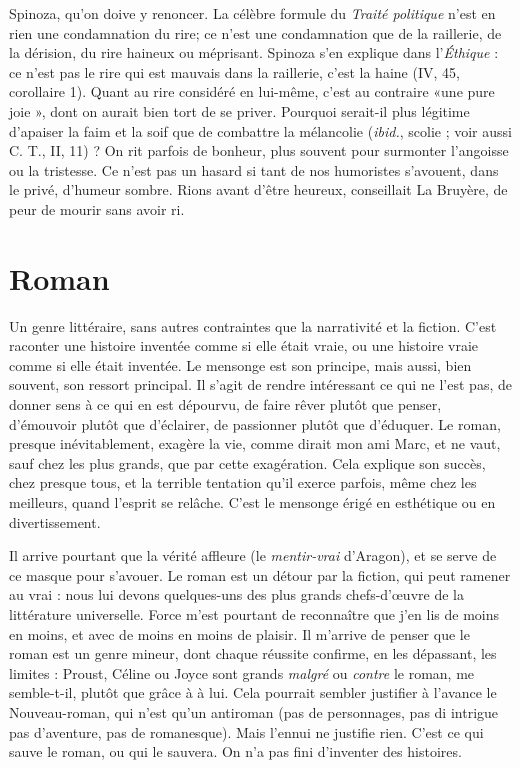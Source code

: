 Spinoza, qu'on doive y renoncer. La célèbre formule du {\it Traité politique} n’est
en rien une condamnation du rire; ce n’est une condamnation que de la
raillerie, de la dérision, du rire haineux ou méprisant. Spinoza s’en explique
dans l’{\it Éthique} : ce n’est pas le rire qui est mauvais dans la raillerie, c’est la haine
(IV, 45, corollaire 1). Quant au rire considéré en lui-même, c’est au contraire
«une pure joie », dont on aurait bien tort de se priver. Pourquoi serait-il plus
légitime d’apaiser la faim et la soif que de combattre la mélancolie ({\it ibid.},
scolie ; voir aussi C. T., II, 11) ? On rit parfois de bonheur, plus souvent pour
surmonter l'angoisse ou la tristesse. Ce n’est pas un hasard si tant de nos humoristes
s’avouent, dans le privé, d'humeur sombre. Rions avant d’être heureux,
conseillait La Bruyère, de peur de mourir sans avoir ri.

\section{Roman}
Un genre littéraire, sans autres contraintes que la narrativité et la
fiction. C’est raconter une histoire inventée comme si elle était
vraie, ou une histoire vraie comme si elle était inventée. Le mensonge est son
principe, mais aussi, bien souvent, son ressort principal. Il s’agit de rendre intéressant
ce qui ne l’est pas, de donner sens à ce qui en est dépourvu, de faire
rêver plutôt que penser, d’émouvoir plutôt que d'éclairer, de passionner plutôt
que d’éduquer. Le roman, presque inévitablement, exagère la vie, comme dirait
mon ami Marc, et ne vaut, sauf chez les plus grands, que par cette exagération.
Cela explique son succès, chez presque tous, et la terrible tentation qu’il exerce
parfois, même chez les meilleurs, quand l'esprit se relâche. C’est le mensonge
érigé en esthétique ou en divertissement.

Il arrive pourtant que la vérité affleure (le {\it mentir-vrai} d'Aragon), et se serve
de ce masque pour s’avouer. Le roman est un détour par la fiction, qui peut
ramener au vrai : nous lui devons quelques-uns des plus grands chefs-d’œuvre de
la littérature universelle. Force m'est pourtant de reconnaître que j'en lis de
moins en moins, et avec de moins en moins de plaisir. Il m’arrive de penser que
le roman est un genre mineur, dont chaque réussite confirme, en les dépassant,
les limites : Proust, Céline ou Joyce sont grands {\it malgré} ou {\it contre} le roman, me
semble-t-il, plutôt que grâce à à lui. Cela pourrait sembler justifier à l’avance le
Nouveau-roman, qui n’est qu’un antiroman (pas de personnages, pas di intrigue
pas d'aventure, pas de romanesque). Mais l’ennui ne justifie rien. C’est ce qui
sauve le roman, ou qui le sauvera. On n’a pas fini d’inventer des histoires.

